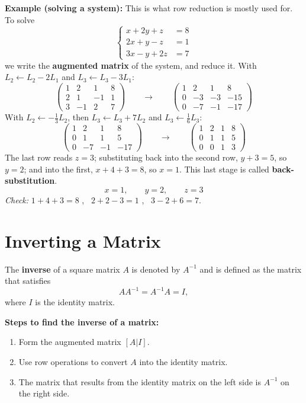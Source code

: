 \documentclass[]{article}
\begin{document}
	\noindent \textbf{Example (solving a system):}
	This is what row reduction is mostly used for.
	To solve
	$$
	\begin{cases}
		x + 2y + z &= 8 \\
		2x + y - z &= 1 \\
		3x - y + 2z &= 7
	\end{cases}
	$$
	we write the \textbf{augmented matrix} of the system, and reduce it.
	With $L_2 \leftarrow L_2 - 2L_1$ and $L_3 \leftarrow L_3 - 3L_1$:
	$$
	\left(\begin{array}{ccc|c}
		1 & 2 & 1 & 8 \\
		2 & 1 & -1 & 1 \\
		3 & -1 & 2 & 7
	\end{array}\right)
	\qquad \longrightarrow \qquad
	\left(\begin{array}{ccc|c}
		1 & 2 & 1 & 8 \\
		0 & -3 & -3 & -15 \\
		0 & -7 & -1 & -17
	\end{array}\right)
	$$
	With $L_2 \leftarrow -\frac{1}{3}L_2$, then $L_3 \leftarrow L_3 + 7L_2$ and $L_3 \leftarrow \frac{1}{6}L_3$:
	$$
	\left(\begin{array}{ccc|c}
		1 & 2 & 1 & 8 \\
		0 & 1 & 1 & 5 \\
		0 & -7 & -1 & -17
	\end{array}\right)
	\qquad \longrightarrow \qquad
	\left(\begin{array}{ccc|c}
		1 & 2 & 1 & 8 \\
		0 & 1 & 1 & 5 \\
		0 & 0 & 1 & 3
	\end{array}\right)
	$$
	The last row reads $z = 3$; substituting back into the second row, $y + 3 = 5$, so $y = 2$; and into the first, $x + 4 + 3 = 8$, so $x = 1$.
	This last stage is called \textbf{back-substitution}.
	$$
	x = 1, \qquad y = 2, \qquad z = 3
	$$
	\textit{Check:} $1 + 4 + 3 = 8$ \checkmark, \ $2 + 2 - 3 = 1$ \checkmark, \ $3 - 2 + 6 = 7$. \checkmark
	
	\section{Inverting a Matrix}
	
	The \textbf{inverse} of a square matrix $A$ is denoted by $A^{-1}$ and is defined as the matrix that satisfies
	$$
	AA^{-1} = A^{-1}A = I,
	$$
	where $I$ is the identity matrix.
	
	\textbf{Steps to find the inverse of a matrix:}
	\begin{enumerate}
		\item Form the augmented matrix $[A | I]$.
		\item Use row operations to convert $A$ into the identity matrix.
		\item The matrix that results from the identity matrix on the left side is $A^{-1}$ on the right side.
	\end{enumerate}
	
\end{document}
